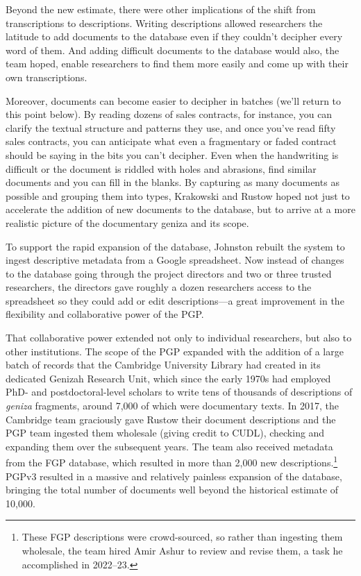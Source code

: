 \documentclass{article}
\begin{document}
Beyond the new estimate, there were other implications of the shift from transcriptions to descriptions. Writing descriptions allowed researchers the latitude to add documents to the database even if they couldn’t decipher every word of them. And adding difficult documents to the database would also, the team hoped, enable researchers to find them more easily and come up with their own transcriptions. 

Moreover, documents can become easier to decipher in batches (we’ll return to this point below). By reading dozens of sales contracts, for instance, you can clarify the textual structure and patterns they use, and once you’ve read fifty sales contracts, you can anticipate what even a fragmentary or faded contract should be saying in the bits you can’t decipher. Even when the handwriting is difficult or the document is riddled with holes and abrasions, find similar documents and you can fill in the blanks. By capturing as many documents as possible and grouping them into types, Krakowski and Rustow hoped not just to accelerate the addition of new documents to the database, but to arrive at a more realistic picture of the documentary geniza and its scope.

To support the rapid expansion of the database, Johnston rebuilt the system to ingest descriptive metadata from a Google spreadsheet. Now instead of changes to the database going through the project directors and two or three trusted researchers, the directors gave roughly a dozen researchers access to the spreadsheet so they could add or edit descriptions—a great improvement in the flexibility and collaborative power of the PGP. 

That collaborative power extended not only to individual researchers, but also to other institutions. The scope of the PGP expanded with the addition of a large batch of records that the Cambridge University Library had created in its dedicated Genizah Research Unit, which since the early 1970s had employed PhD- and postdoctoral-level scholars to write tens of thousands of descriptions of \textit{geniza} fragments, around 7,000 of which were documentary texts. In 2017, the Cambridge team graciously gave Rustow their document descriptions and the PGP team ingested them wholesale (giving credit to CUDL), checking and expanding them over the subsequent years. The team also received metadata from the FGP database, which resulted in more than 2,000 new descriptions.\footnote{These FGP descriptions were crowd-sourced, so rather than ingesting them wholesale, the team hired Amir Ashur to review and revise them, a task he accomplished in 2022–23.
} PGPv3 resulted in a massive and relatively painless expansion of the database, bringing the total number of documents well beyond the historical estimate of 10,000. 
\end{document}
